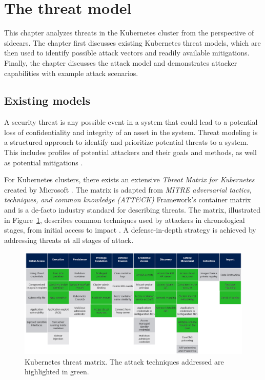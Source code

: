 \documentclass[english, 12pt, a4paper, sci, utf8, a-2b, online]{aaltothesis}
\begin{document}
\clearpage

\section{The threat model} \label{sec:threats}

This chapter analyzes threats in the Kubernetes cluster from the perspective of sidecars.
The chapter first discusses existing Kubernetes threat models, which are then used to identify possible attack vectors and readily available mitigations.
Finally, the chapter discusses the attack model and demonstrates attacker capabilities with example attack scenarios.

\subsection{Existing models}

A security threat is any possible event in a system that could lead to a potential loss of confidentiality and integrity of an asset in the system.
Threat modeling is a structured approach to identify and prioritize potential threats to a system.
This includes profiles of potential attackers and their goals and methods, as well as potential mitigations \cite{shevchenko2018threat}.

For Kubernetes clusters, there exists an extensive \emph{Threat Matrix for Kubernetes} created by Microsoft \cite{k8s-threat-matrix}.
The matrix is adapted from \emph{MITRE adversarial tactics, techniques, and common knowledge (ATT\&CK)} Framework's container matrix \cite{mitre-matrix} and is a de-facto industry standard for describing threats.
The matrix, illustrated in Figure~\ref{fig:threat-matrix}, describes common techniques used by attackers in chronological stages, from initial access to impact \cite{minna2021understanding}.
A defense-in-depth strategy is achieved by addressing threats at all stages of attack.

\begin{figure}[h!]
  \centering
  \includegraphics[width=\linewidth]{files/Matrix.png}
  \caption{Kubernetes threat matrix. The attack techniques addressed are highlighted in green.}
  \label{fig:threat-matrix}
\end{figure}
\end{document}
